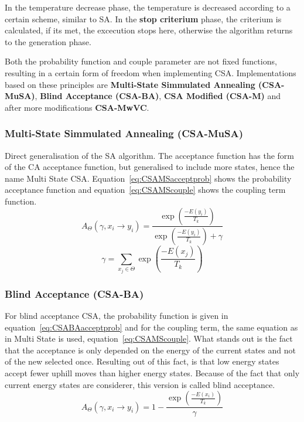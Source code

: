 In the temperature decrease phase, the temperature is decreased according to a certain scheme, similar to SA.
In the \textbf{stop criterium} phase, the criterium is calculated, if its met, the excecution stops here, otherwise the algorithm returns to the generation phase.
\par 
Both the probability function and couple parameter are not fixed functions, resulting in a certain form of freedom when implementing CSA.
Implementations based on these principles are \textbf{Multi-State Simmulated Annealing (CSA-MuSA)}, \textbf{Blind Acceptance (CSA-BA)}, \textbf{CSA Modified (CSA-M)} and after more modifications \textbf{CSA-MwVC}.
\subsubsection{Multi-State Simmulated Annealing (CSA-MuSA)}
Direct generalisation of the SA algorithm.
The acceptance function has the form of the CA acceptance function, but generalised to include more states, hence the name Multi State CSA.
Equation~\ref{eq:CSAMSacceptprob} shows the probability acceptance function and equation~\ref{eq:CSAMScouple} shows the coupling term function.
\begin{equation}
	A_\Theta(\gamma,x_i \rightarrow y_i)=\frac{\exp(\frac{-E(y_i)}{T_k})}{\exp(\frac{-E(y_i)}{T_k})+\gamma}
	\label{eq:CSAMSacceptprob}
\end{equation}
\begin{equation}
	\gamma = \sum_{x_j \in \Theta}^{}\exp(\frac{-E(x_j)}{T_k})
	\label{eq:CSAMScouple}
\end{equation}
\subsubsection{Blind Acceptance (CSA-BA)}
For blind acceptance CSA, the probability function is given in equation~\ref{eq:CSABAacceptprob} and for the coupling term, the same equation as in Multi State is used, equation~\ref{eq:CSAMScouple}.
What stands out is the fact that the acceptance is only depended on the energy of the current states and not of the new selected once.
Resulting out of this fact, is that low energy states accept fewer uphill moves than higher energy states.
Because of the fact that only current energy states are considerer, this version is called blind acceptance.
\begin{equation}
	A_\Theta(\gamma,x_i \rightarrow y_i)=1 - \frac{\exp(\frac{-E(x_i)}{T_k})}{\gamma}
	\label{eq:CSABAacceptprob}
\end{equation}
